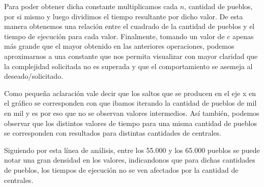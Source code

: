 Para poder obtener dicha constante multiplicamos cada $n$, cantidad de pueblos, por si mismo y luego dividimos el tiempo resultante por dicho valor. De esta manera obtenemos una relaci\'on entre el cuadrado de la cantidad de pueblos y el tiempo de ejecuci\'on para cada valor. 
Finalmente, tomando un valor de $c$ apenas m\'as grande que el mayor obtenido en las anteriores operaciones, podemos aproximarnos a una constante que nos permita visualizar con mayor claridad que la complejidad solicitada no es superada y que el comportamiento se asemeja al deseado/solicitado.

Como peque\~na aclaraci\'on vale decir que los saltos que se producen en el eje x en el gr\'afico se corresponden con que ibamos iterando la cantidad de pueblos de mil en mil y es por eso que no se observan valores intermedios. 
As\'i tambi\'en, podemos observar que los distintos valores de tiempo para una misma cantidad de pueblos se corresponden con resultados para distintas cantidades de centrales.

Siguiendo por esta l\'inea de an\'alisis, entre los 55.000 y los 65.000 pueblos se puede notar una gran densidad en los valores, indicandonos que para dichas cantidades de pueblos, los tiempos de ejecuci\'on no se ven afectados por la cantidad de centrales.
